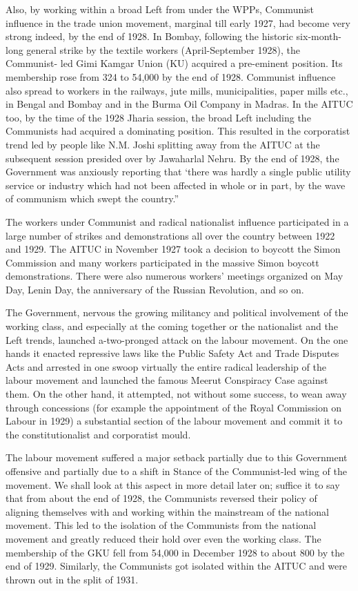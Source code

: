 Also, by working within a broad Left from under the WPPs, Communist influence in the trade union movement, marginal till early 1927, had become very strong indeed, by the end of 1928. In Bombay, following the historic six-month-long general strike by the textile workers (April-September 1928), the Communist- led Gimi Kamgar Union (KU) acquired a pre-eminent position. Its membership rose from 324 to 54,000 by the end of 1928. Communist influence also spread to workers in the railways, jute mills, municipalities, paper mills etc., in Bengal and Bombay and in the Burma Oil Company in Madras. In the AITUC too, by the time of the 1928 Jharia session, the broad Left including the Communists had acquired a dominating position. This resulted in the corporatist trend led by people like N.M. Joshi splitting away from the AITUC at the subsequent session presided over by Jawaharlal Nehru. By the end of 1928, the Government was anxiously reporting that ‘there was hardly a single public utility service or industry which had not been affected in whole or in part, by the wave of communism which swept the country.”

The workers under Communist and radical nationalist influence participated in a large number of strikes and demonstrations all over the country between 1922 and 1929. The AITUC in November 1927 took a decision to boycott the Simon Commission and many workers participated in the massive Simon boycott demonstrations. There were also numerous workers’ meetings organized on May Day, Lenin Day, the anniversary of the Russian Revolution, and so on.

The Government, nervous the growing militancy and political involvement of the working class, and especially at the coming together or the nationalist and the Left trends, launched a-two-pronged attack on the labour movement. On the one hands it enacted repressive laws like the Public Safety Act and Trade Disputes Acts and arrested in one swoop virtually the entire radical leadership of the labour movement and launched the famous Meerut Conspiracy Case against them. On the other hand, it attempted, not without some success, to wean away through concessions (for example the appointment of the Royal Commission on Labour in 1929) a substantial section of the labour movement and commit it to the constitutionalist and corporatist mould.

The labour movement suffered a major setback partially due to this Government offensive and partially due to a shift in Stance of the Communist-led wing of the movement. We shall look at this aspect in more detail later on; suffice it to say that from about the end of 1928, the Communists reversed their policy of aligning themselves with and working within the mainstream of the national movement. This led to the isolation of the Communists from the national movement and greatly reduced their hold over even the working class. The membership of the GKU fell from 54,000 in December 1928 to about 800 by the end of 1929. Similarly, the Communists got isolated within the AITUC and were thrown out in the split of 1931.

